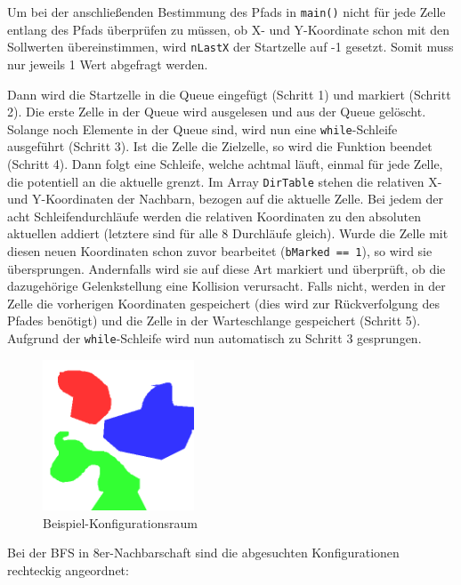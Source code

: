 \documentclass[11pt, a4paper]{article}
\newcommand{\code}{\texttt}
\begin{document}
Um bei der anschließenden Bestimmung des Pfads in \code{main()} nicht für jede Zelle entlang des Pfads überprüfen zu müssen, ob X- und Y-Koordinate schon mit den Sollwerten übereinstimmen, wird \code{nLastX} der Startzelle auf -1 gesetzt. Somit muss nur jeweils 1 Wert abgefragt werden.

Dann wird die Startzelle in die Queue eingefügt (Schritt 1) und markiert (Schritt 2). Die erste Zelle in der Queue wird ausgelesen und aus der Queue gelöscht. Solange noch Elemente in der Queue sind, wird nun eine \code{while}-Schleife ausgeführt (Schritt 3). Ist die Zelle die Zielzelle, so wird die Funktion beendet (Schritt 4). Dann folgt eine Schleife, welche achtmal läuft, einmal für jede Zelle, die potentiell an die aktuelle grenzt. Im Array \code{DirTable} stehen die relativen X- und Y-Koordinaten der Nachbarn, bezogen auf die aktuelle Zelle. Bei jedem der acht Schleifendurchläufe werden die relativen Koordinaten zu den absoluten aktuellen addiert (letztere sind für alle 8 Durchläufe gleich). Wurde die Zelle mit diesen neuen Koordinaten schon zuvor bearbeitet (\code{bMarked == 1}), so wird sie übersprungen. Andernfalls wird sie auf diese Art markiert und überprüft, ob die dazugehörige Gelenkstellung eine Kollision verursacht. Falls nicht, werden in der Zelle die vorherigen Koordinaten gespeichert (dies wird zur Rückverfolgung des Pfades benötigt) und die Zelle in der Warteschlange gespeichert (Schritt 5). Aufgrund der \code{while}-Schleife wird nun automatisch zu Schritt 3 gesprungen.

\begin{figure}[H]
	\center
	\includegraphics[width=0.4\textwidth,frame]{../Termin6/Termin6/cspace.png}
	\caption{Beispiel-Konfigurationsraum}
\end{figure}



Bei der BFS in 8er-Nachbarschaft sind die abgesuchten Konfigurationen rechteckig angeordnet:
\end{document}
